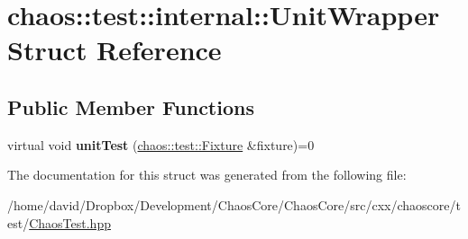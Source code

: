 \hypertarget{structchaos_1_1test_1_1internal_1_1_unit_wrapper}{\section{chaos\-:\-:test\-:\-:internal\-:\-:Unit\-Wrapper Struct Reference}
\label{structchaos_1_1test_1_1internal_1_1_unit_wrapper}
}
\subsection*{Public Member Functions}
\begin{DoxyCompactItemize}
\item 
\hypertarget{structchaos_1_1test_1_1internal_1_1_unit_wrapper_aae6c7754277af545710ed1bba223798a}{virtual void {\bfseries unit\-Test} (\hyperlink{classchaos_1_1test_1_1_fixture}{chaos\-::test\-::\-Fixture} \&fixture)=0}\label{structchaos_1_1test_1_1internal_1_1_unit_wrapper_aae6c7754277af545710ed1bba223798a}

\end{DoxyCompactItemize}


The documentation for this struct was generated from the following file\-:\begin{DoxyCompactItemize}
\item 
/home/david/\-Dropbox/\-Development/\-Chaos\-Core/\-Chaos\-Core/src/cxx/chaoscore/test/\hyperlink{_chaos_test_8hpp}{Chaos\-Test.\-hpp}\end{DoxyCompactItemize}
